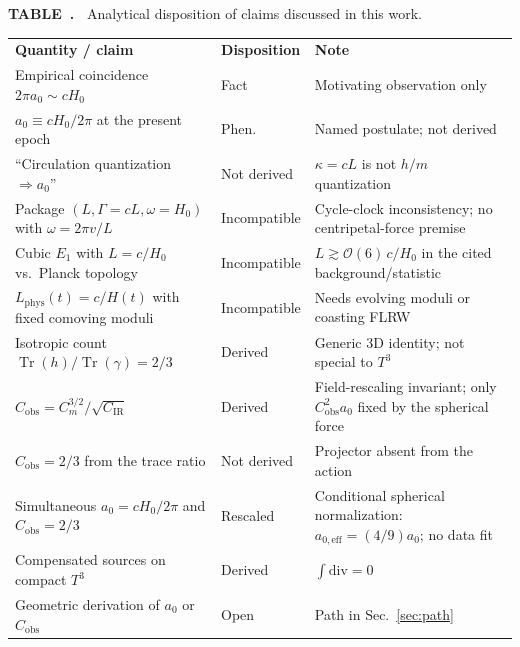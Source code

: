 \documentclass[aps,prd,reprint,superscriptaddress,nofootinbib,floatfix,showkeys]{revtex4-2}
\newcommand{\Tthree}{T^{3}}
\newcommand{\Cobs}{C_{\mathrm{obs}}}
\newcommand{\Cm}{C_{m}}
\newcommand{\CIR}{C_{\mathrm{IR}}}
\newcommand{\azero}{a_{0}}
\newcommand{\Hzero}{H_{0}}
\begin{document}
\onecolumngrid
\vspace{0.9em}
\label{tab:status}
\noindent
\begin{minipage}{\textwidth}
\small
\noindent\textbf{TABLE~\thetable.\ }
Analytical disposition of claims discussed in this work.\\[0.55em]
\begin{ruledtabular}
\begin{tabular}{@{}p{}@{\hspace{0.8em}}p{}@{\hspace{0.8em}}p{}@{}}
\textbf{Quantity / claim} & \textbf{Disposition} & \textbf{Note} \\
\colrule
Empirical coincidence \(2\pi\azero\sim c\Hzero\)
  & Fact & Motivating observation only \\
\hline
\(\azero\equiv c\Hzero/2\pi\) at the present epoch
  & Phen. & Named postulate; not derived \\
\hline
``Circulation quantization \(\Rightarrow\azero\)''
  & Not derived & \(\kappa=cL\) is not \(h/m\) quantization \\
\hline
Package \((L,\Gamma=cL,\omega=\Hzero)\) with \(\omega=2\pi v/L\)
  & Incompatible & Cycle-clock inconsistency; no centripetal-force premise \\
\hline
Cubic \(E_1\) with \(L=c/\Hzero\) vs.\ Planck topology
  & Incompatible & \(L\gtrsim\mathcal{O}(6)\,c/\Hzero\) in the cited background/statistic \\
\hline
\(L_{\mathrm{phys}}(t)=c/H(t)\) with fixed comoving moduli
  & Incompatible & Needs evolving moduli or coasting FLRW \\
\hline
Isotropic count \(\operatorname{Tr}(h)/\operatorname{Tr}(\gamma)=2/3\)
  & Derived & Generic 3D identity; not special to \(\Tthree\) \\
\hline
\(\Cobs=\Cm^{3/2}/\sqrt{\CIR}\)
  & Derived & Field-rescaling invariant; only \(\Cobs^2\azero\) fixed by the spherical force \\
\hline
\(\Cobs=2/3\) from the trace ratio
  & Not derived & Projector absent from the action \\
\hline
Simultaneous \(\azero=c\Hzero/2\pi\) and \(\Cobs=2/3\)
  & Rescaled & Conditional spherical normalization: \(a_{0,\mathrm{eff}}=(4/9)\azero\); no data fit \\
\hline
Compensated sources on compact \(\Tthree\)
  & Derived & \(\int\mathrm{div}=0\) \\
\hline
Geometric derivation of \(\azero\) or \(\Cobs\)
  & Open & Path in Sec.~\ref{sec:path} \\
\end{tabular}
\end{ruledtabular}
\end{minipage}
\vspace{1.0em}
\twocolumngrid
\end{document}
